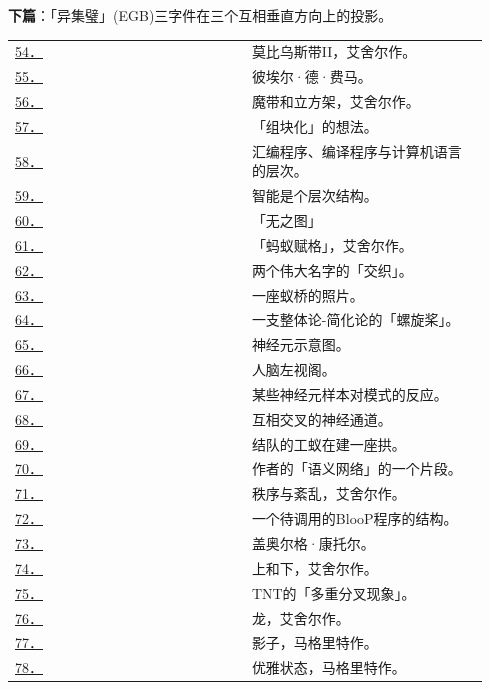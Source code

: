 \documentclass[
  12pt,
  twoside,
  openright,
  oldfontcommands,
]{memoir}
\begin{document}
\hfill\break

\textbf{下篇}：「异集璧」(EGB)三字件在三个互相垂直方向上的投影。

\begin{longtable}[]{>{\raggedright\arraybackslash}p{0.47\linewidth} >{\raggedright\arraybackslash}p{0.47\linewidth}}
\toprule\noalign{}
\endhead
\bottomrule\noalign{}
\endlastfoot
\hyperref[fig:54]{54．} & 莫比乌斯带II，艾舍尔作。 \\
\hyperref[fig:55]{55．} & 彼埃尔·德·费马。 \\
\hyperref[fig:56]{56．} & 魔带和立方架，艾舍尔作。 \\
\hyperref[fig:57]{57．} & 「组块化」的想法。 \\
\hyperref[fig:58]{58．} & 汇编程序、编译程序与计算机语言的层次。 \\
\hyperref[fig:59]{59．} & 智能是个层次结构。 \\
\hyperref[fig:60]{60．} & 「无之图」 \\
\hyperref[fig:61]{61．} & 「蚂蚁赋格」，艾舍尔作。 \\
\hyperref[fig:62]{62．} & 两个伟大名字的「交织」。 \\
\hyperref[fig:63]{63．} & 一座蚁桥的照片。 \\
\hyperref[fig:64]{64．} & 一支整体论-简化论的「螺旋桨」。 \\
\hyperref[fig:65]{65．} & 神经元示意图。 \\
\hyperref[fig:66]{66．} & 人脑左视阁。 \\
\hyperref[fig:67]{67．} & 某些神经元样本对模式的反应。 \\
\hyperref[fig:68]{68．} & 互相交叉的神经通道。 \\
\hyperref[fig:69]{69．} & 结队的工蚁在建一座拱。 \\
\hyperref[fig:70]{70．} & 作者的「语义网络」的一个片段。 \\
\hyperref[fig:71]{71．} & 秩序与紊乱，艾舍尔作。 \\
\hyperref[fig:72]{72．} & 一个待调用的BlooP程序的结构。 \\
\hyperref[fig:73]{73．} & 盖奥尔格·康托尔。 \\
\hyperref[fig:74]{74．} & 上和下，艾舍尔作。 \\
\hyperref[fig:75]{75．} & TNT的「多重分叉现象」。 \\
\hyperref[fig:76]{76．} & 龙，艾舍尔作。 \\
\hyperref[fig:77]{77．} & 影子，马格里特作。 \\
\hyperref[fig:78]{78．} & 优雅状态，马格里特作。 \\

\end{longtable}
\end{document}
